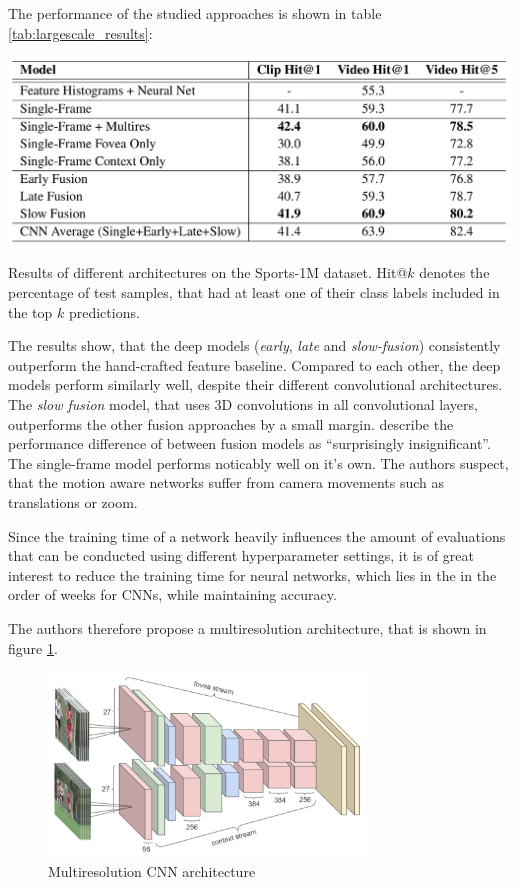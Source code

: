 The performance of the studied approaches is shown in table \ref{tab:largescale_results}:
\begin{table}[H]
    \centering
    \includegraphics{img_deep/largescale_results}
    \caption{Results of different architectures on the Sports-1M dataset. Hit@$k$ denotes the percentage of test samples, that had at least one of their class labels included in the top $k$ predictions. \cite{karpathy_large-scale_2014}}
    \label{tab:largescale_results}
\end{table}

The results show, that the deep models (\textit{early}, \textit{late} and \textit{slow-fusion}) consistently outperform the hand-crafted feature baseline.
Compared to each other, the deep models perform similarly well, despite their different convolutional architectures.
The \textit{slow fusion} model, that uses 3D convolutions in all convolutional layers, outperforms the other fusion approaches by a small margin.
\textcite{karpathy_large-scale_2014} describe the performance difference of between fusion models as ``surprisingly insignificant''\cite{karpathy_large-scale_2014}.
The single-frame model performs noticably well on it's own.
The authors suspect, that the motion aware networks suffer from camera movements such as translations or zoom.

Since the training time of a network heavily influences the amount of evaluations that can be conducted using different hyperparameter settings, it is of great interest to reduce the training time for neural networks, which lies in the in the order of weeks for CNNs\cite{karpathy_large-scale_2014}, while maintaining accuracy.

The authors therefore propose a multiresolution architecture, that is shown in figure \ref{fig:largescale_multiresolution}.
\begin{figure}[H]
    \centering
    \includegraphics[width=0.75\textwidth]{img_deep/largescale_multiresolution.png}
    \caption{Multiresolution CNN architecture \cite{karpathy_large-scale_2014}}
    \label{fig:largescale_multiresolution}
\end{figure}

